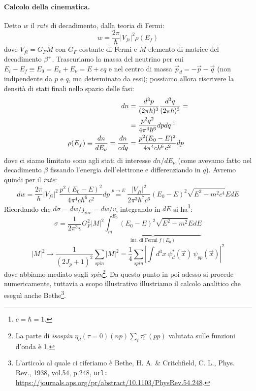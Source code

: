 \paragraph{Calcolo della cinematica.}Detto $w$ il \textit{rate} di decadimento, dalla teoria di Fermi:
$$w = \frac{2\pi}{\hbar}|V_{fi}|^2\rho(E_f)$$
dove $V_{fi} = G_F M$ con $G_F$ costante di Fermi e $M$ elemento di matrice del decadimento $\beta^+$. Trascuriamo la massa del neutrino per cui $E_i-E_f\equiv E_0 = E_e + E_\nu = E + cq$ e nel centro di massa $\vec{p}_d = -\vec{p}-\vec{q}$ (non indipendente da $p$ e $q$, ma determinato da essi); possiamo allora riscrivere la densità di stati finali nello spazio delle fasi:
\begin{displaymath}
\begin{aligned}
dn &= \frac{d^3 p}{(2\pi\hbar)^3}\frac{d^3 q}{(2\pi\hbar)^3} =\\
&= \frac{p^2 q^2}{4\pi^4 \hbar^6} dpdq\: \footnotemark \\
\rho(E_f)\equiv \frac{dn}{dE_\nu} = \frac{dn}{cdq} &= \frac{p^2 (E_0-E)^2}{4\pi^4 c \hbar^6\,c^2} dp
\end{aligned}
\end{displaymath}
dove ci siamo limitato sono agli stati di interesse $dn/dE_\nu$ (come avevamo fatto nel decadimento $\beta$ fissando l'energia dell'elettrone e differenziando in $q$). Avremo quindi per il \textit{rate}:
$$dw = \frac{2\pi}{\hbar}|V_{fi}|^2\,\frac{p^2 (E_0-E)^2}{4\pi^4 c \hbar^6\,c^2} dp \stackrel{p\to E}{=} \frac{|V_{fi}|^2}{2\pi^3 \hbar^7 c^6} (E_0-E)^2 \sqrt{E^2 - m^2c^4} E dE $$
Ricordando che $d\sigma = dw/j_{inc} = dw/v$, integrando in $dE$ si ha\footnote{$c=\hbar=1$.}:
$$\sigma = \frac{1}{2\pi^3 v} G_F^2 |M|^2 \underbrace{\int_m^{E_0} (E_0-E)^2 \sqrt{E^2-m^2}E dE}_{\text{int. di Fermi } f(E_0)} $$
$$|M|^2 \to \frac{1}{(2J_p +1)^2} \sum_{spin} |M|^2 = \frac{1}{4} \sum_{spin} |\int d^3x\: \psi^*_d (\vec{x})\,\psi_{pp}(\vec{x})|^2$$
dove abbiamo mediato sugli \textit{spin}\footnote{La parte di \textit{isospin} $\eta_d(\tau=0)(np)\sum_i\tau^-_i (pp)$ valutata sulle funzioni d'onda è 1.}. Da questo punto in poi adesso si procede numericamente, tuttavia a scopo illustrativo illustriamo il calcolo analitico che eseguì anche Bethe\footnote{L'articolo al quale ci riferiamo è Bethe, H. A. \& Critchfield, C. L., Phys. Rev., 1938, vol.54, p.248, \texttt{url:} \url{https://journals.aps.org/pr/abstract/10.1103/PhysRev.54.248}.}.

